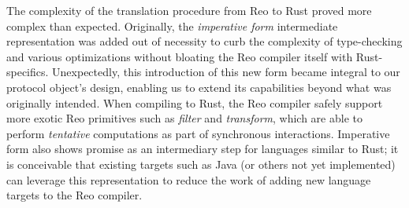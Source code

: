 The complexity of the translation procedure from Reo to Rust
proved more complex than expected. Originally, the \textit{imperative form} intermediate representation was added out of necessity to curb the complexity of type-checking and various optimizations without bloating the Reo compiler itself with Rust-specifics. Unexpectedly, this introduction of this new form became integral to our protocol object's design, enabling us to extend its capabilities beyond what was originally intended. When compiling to Rust, the Reo compiler safely support more exotic Reo primitives such as \textit{filter} and \textit{transform}, which are able to perform \textit{tentative} computations as part of synchronous interactions. Imperative form also shows promise as an intermediary step for languages similar to Rust; it is conceivable that existing targets such as Java (or others not yet implemented) can leverage this representation to reduce the work of adding new language targets to the Reo compiler. 

